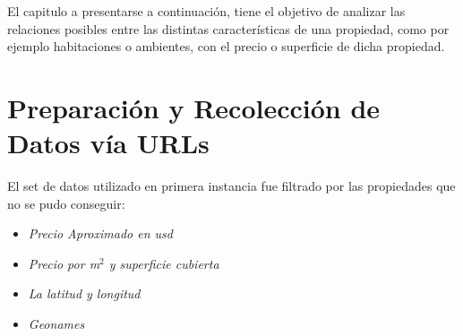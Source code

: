 \documentclass[a4paper, 10pt]{article}
\begin{document}
		El capitulo a presentarse a continuación, tiene el objetivo de analizar las relaciones posibles entre las distintas características de una propiedad, como por ejemplo habitaciones o ambientes, con el precio o superficie de dicha propiedad.
		
		\section{Preparación y Recolección de Datos vía URLs}
		
			El set de datos utilizado en primera instancia fue filtrado por las propiedades que no se pudo conseguir:
		
		\begin{itemize}
		\item \emph{Precio Aproximado en usd}
			
		\item \emph{Precio por m$^2$ y superficie cubierta}

		\item \emph{La latitud y longitud} 
			
		\item \emph{Geonames} 
			
		\end{itemize}
		
\end{document}
